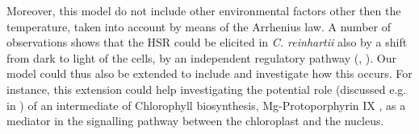 \documentclass[oneside, 10pt, a4paper, twocolumn]{article}
\begin{document}
Moreover, this model do not include other environmental factors other then the temperature, taken into account by means of the Arrhenius law. A number of observations shows that the HSR could be elicited in \emph{C. reinhartii} also by a shift from dark to light of the cells, by an independent regulatory pathway (\cite{vonGromoff1989}, \cite{Kropat1995}). Our model could thus also be extended to include and investigate how this occurs. 
For instance, this extension could help investigating the potential role (discussed e.g. in \cite{vonGromoff2006, Kropat2000, vonGromoff2008}) of an intermediate of Chlorophyll biosynthesis, Mg-Protoporphyrin IX , as a mediator in the signalling pathway between the chloroplast and the nucleus.



\end{document}
